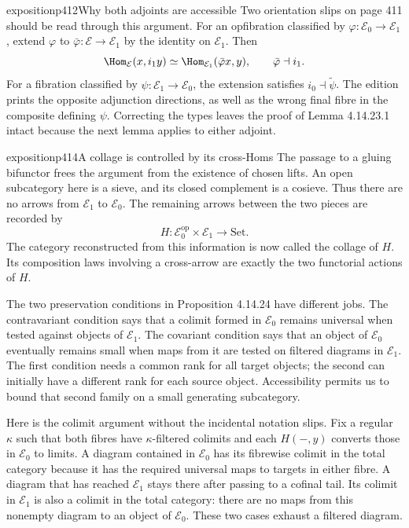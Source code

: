 \begin{dcomment}{exposition}{p412}{Why both adjoints are accessible}
Two orientation slips on page 411 should be read through this argument. For an opfibration classified by $\varphi:\mathcal E_0\to\mathcal E_1$, extend $\varphi$ to $\bar\varphi:\mathcal E\to\mathcal E_1$ by the identity on $\mathcal E_1$. Then
\[
 \Hom_{\mathcal E}(x,i_1y)
 \simeq\Hom_{\mathcal E_1}(\bar\varphi x,y),
 \qquad\bar\varphi\dashv i_1.
\]
For a fibration classified by $\psi:\mathcal E_1\to\mathcal E_0$, the extension satisfies $i_0\dashv\widetilde\psi$. The edition prints the opposite adjunction directions, as well as the wrong final fibre in the composite defining $\psi$. Correcting the types leaves the proof of Lemma 4.14.23.1 intact because the next lemma applies to either adjoint.
\end{dcomment}

\begin{dcomment}{exposition}{p414}{A collage is controlled by its cross-Homs}
The passage to a gluing bifunctor frees the argument from the existence of chosen lifts. An open subcategory here is a sieve, and its closed complement is a cosieve. Thus there are no arrows from $\mathcal E_1$ to $\mathcal E_0$. The remaining arrows between the two pieces are recorded by
\[
 H:\mathcal E_0^{\mathrm{op}}\times\mathcal E_1\longrightarrow\mathrm{Set}.
\]
The category reconstructed from this information is now called the collage of $H$. Its composition laws involving a cross-arrow are exactly the two functorial actions of $H$.

The two preservation conditions in Proposition 4.14.24 have different jobs. The contravariant condition says that a colimit formed in $\mathcal E_0$ remains universal when tested against objects of $\mathcal E_1$. The covariant condition says that an object of $\mathcal E_0$ eventually remains small when maps from it are tested on filtered diagrams in $\mathcal E_1$. The first condition needs a common rank for all target objects; the second can initially have a different rank for each source object. Accessibility permits us to bound that second family on a small generating subcategory.

Here is the colimit argument without the incidental notation slips. Fix a regular $\kappa$ such that both fibres have $\kappa$-filtered colimits and each $H(-,y)$ converts those in $\mathcal E_0$ to limits. A diagram contained in $\mathcal E_0$ has its fibrewise colimit in the total category because it has the required universal maps to targets in either fibre. A diagram that has reached $\mathcal E_1$ stays there after passing to a cofinal tail. Its colimit in $\mathcal E_1$ is also a colimit in the total category: there are no maps from this nonempty diagram to an object of $\mathcal E_0$. These two cases exhaust a filtered diagram.


\end{dcomment}
